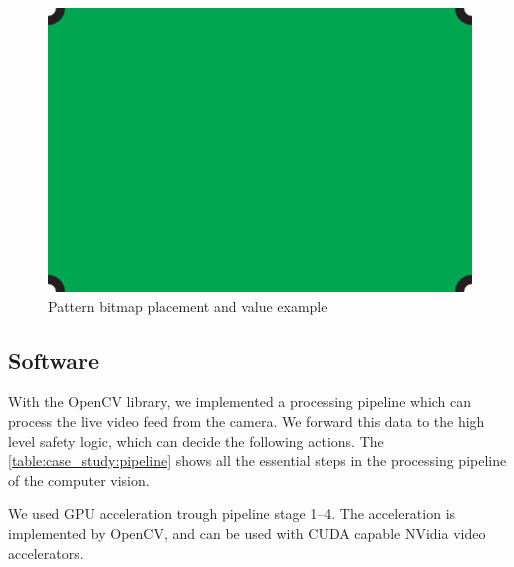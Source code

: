 \begin{figure}[h]
	\centering
	\includegraphics[valign=c,width=.65\linewidth]{include/figures/chapter_6/math_2}
	\caption{Pattern bitmap placement and value example}
	\label{fig:case_study:convoluter_image}
\end{figure}

\subsection{Software}

With the OpenCV library, we implemented a processing pipeline which can process the live video feed from the camera. We forward this data to the high level safety logic, which can decide the following actions. The \cref{table:case_study:pipeline} shows all the essential steps in the processing pipeline of the computer vision.

We used GPU acceleration trough pipeline stage 1--4. The acceleration is implemented by OpenCV, and can be used with CUDA capable NVidia video accelerators.

